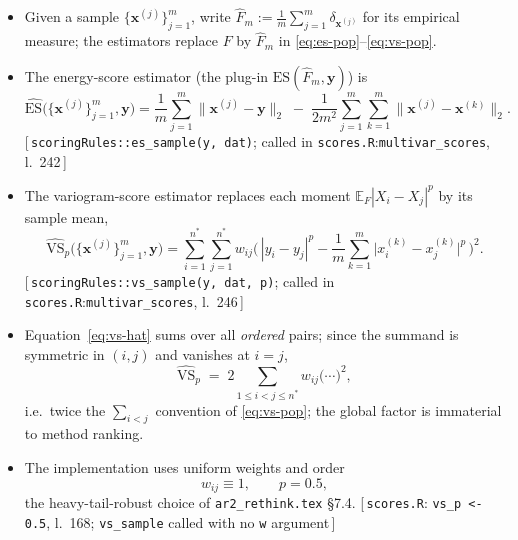 \documentclass[11pt]{article}
\newcommand{\E}{\mathbb{E}}
\newcommand{\impl}[1]{{\footnotesize\textsf{\textcolor{blue!45!black}{[\,#1\,]}}}}
\begin{document}
\begin{itemize}[leftmargin=1.5em, itemsep=3pt]
  \item Given a sample $\{\bm x^{(j)}\}_{j=1}^{m}$, write
        $\hat F_m := \tfrac1m\sum_{j=1}^m\delta_{\bm x^{(j)}}$ for its
        empirical measure; the estimators replace $F$ by $\hat F_m$ in
        \eqref{eq:es-pop}--\eqref{eq:vs-pop}.
  \item The energy-score estimator (the plug-in
        $\mathrm{ES}(\hat F_m,\bm y)$) is
        \begin{equation}
          \widehat{\mathrm{ES}}\big(\{\bm x^{(j)}\}_{j=1}^{m},\bm y\big)
            = \frac{1}{m}\sum_{j=1}^{m}\big\|\bm x^{(j)}-\bm y\big\|_2
            \;-\; \frac{1}{2m^{2}}\sum_{j=1}^{m}\sum_{k=1}^{m}
                   \big\|\bm x^{(j)}-\bm x^{(k)}\big\|_2 .
          \label{eq:es-hat}
        \end{equation}
        \impl{\texttt{scoringRules::es\_sample(y, dat)}; called in \texttt{scores.R}:\texttt{multivar\_scores}, l.~242}
  \item The variogram-score estimator replaces each moment
        $\E_F|X_i-X_j|^p$ by its sample mean,
        \begin{equation}
          \widehat{\mathrm{VS}}_p\big(\{\bm x^{(j)}\}_{j=1}^{m},\bm y\big)
            = \sum_{i=1}^{n^\ast}\sum_{j=1}^{n^\ast} w_{ij}
              \Big(\,|y_i-y_j|^p
                   - \frac{1}{m}\sum_{k=1}^{m}
                     \big|x_i^{(k)}-x_j^{(k)}\big|^p\,\Big)^{2}.
          \label{eq:vs-hat}
        \end{equation}
        \impl{\texttt{scoringRules::vs\_sample(y, dat, p)}; called in \texttt{scores.R}:\texttt{multivar\_scores}, l.~246}
  \item Equation~\eqref{eq:vs-hat} sums over all \emph{ordered} pairs;
        since the summand is symmetric in $(i,j)$ and vanishes at $i=j$,
        \begin{equation}
          \widehat{\mathrm{VS}}_p
            \;=\; 2\!\!\sum_{1\le i<j\le n^\ast}\!\! w_{ij}
                  \big(\cdots\big)^2 ,
        \end{equation}
        i.e.\ twice the $\sum_{i<j}$ convention of \eqref{eq:vs-pop}; the
        global factor is immaterial to method ranking.
  \item The implementation uses uniform weights and order
        \begin{equation}
          w_{ij}\equiv 1,
          \qquad
          p = 0.5 ,
        \end{equation}
        the heavy-tail-robust choice of \texttt{ar2\_rethink.tex} \S7.4.
        \impl{\texttt{scores.R}: \texttt{vs\_p <- 0.5}, l.~168; \texttt{vs\_sample} called with no \texttt{w} argument}
\end{itemize}
\end{document}
